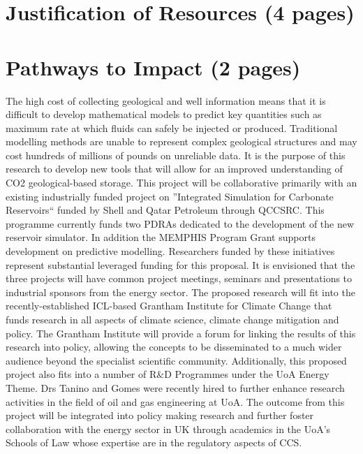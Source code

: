 \documentclass[12pts,a4paper,amsmath,amssymb,floatfix]{article}%
\begin{document}
\section{Justification of Resources (4 pages)}


\section{Pathways to Impact (2 pages)}


The high cost of collecting geological and well information means that it is difficult to develop mathematical models to predict key quantities such as maximum rate at which fluids can safely be injected or produced.  Traditional modelling methods are unable to represent complex geological structures and may cost hundreds of millions of pounds on unreliable data.  It is the purpose of this research to develop new tools that will allow for an improved understanding of CO2 geological-based storage. This project will be collaborative primarily with an existing industrially funded project on ”Integrated Simulation for Carbonate Reservoirs“ funded by Shell and Qatar Petroleum through QCCSRC. This programme currently funds two PDRAs dedicated to the development of the new reservoir simulator. In addition the MEMPHIS Program Grant supports development on predictive modelling. Researchers funded by these initiatives represent substantial leveraged funding for this proposal.  It is envisioned that the three projects will have common project meetings, seminars and presentations to industrial sponsors from the energy sector.
The proposed research will fit into the recently-established ICL-based Grantham Institute for Climate Change that funds research in all aspects of climate science, climate change mitigation and policy.   The Grantham Institute will provide a forum for linking the results of this research into policy, allowing the concepts to be disseminated to a much wider audience beyond the specialist scientific community. Additionally, this proposed project also fits into a number of R$\&$D Programmes under the UoA Energy Theme. Drs Tanino and Gomes were recently hired to further enhance research activities in the field of oil and gas engineering at UoA.  The outcome from this project will be integrated into policy making research and further foster collaboration with the energy sector in UK through academics in the UoA’s Schools of Law whose expertise are in the regulatory aspects of CCS. 
\end{document}
